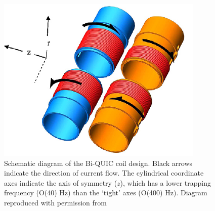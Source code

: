   

	\begin{figure}
	\begin{minipage}{0.55\textwidth} %
	\vspace{0pt}
		\includegraphics[width=\textwidth]{fig/apparatus/biquic_coil.pdf}

	\end{minipage}
	\hfill
	\begin{minipage}{0.45\textwidth}
	\vspace{0pt}
	\caption{Schematic diagram of the Bi-QUIC coil design. Black arrows indicate the direction of current flow. The cylindrical coordinate axes indicate the axis of symmetry ($z$), which has a lower trapping frequency (O(40) Hz) than the `tight' axes (O(400) Hz). Diagram reproduced with permission from \cite{Dall07}}
	\end{minipage}
	\end{figure}

